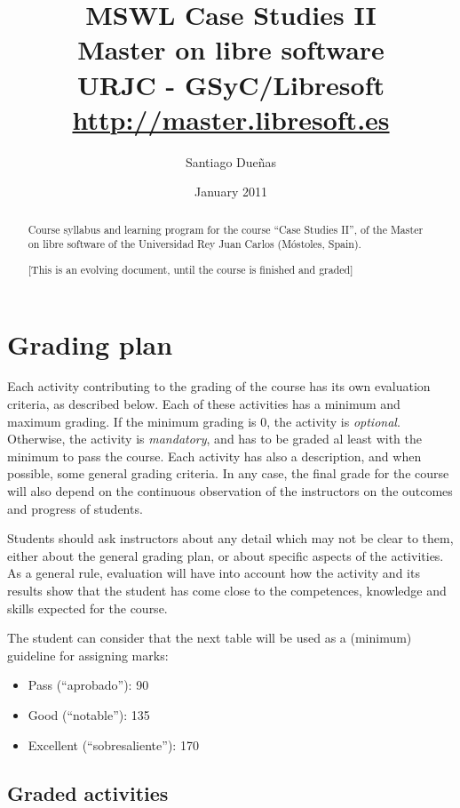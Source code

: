 \documentclass[a4paper]{article}
\title{MSWL Case Studies II \\
Master on libre software \\
URJC - GSyC/Libresoft \\
\url{http://master.libresoft.es}}
\author{Santiago Dueñas}
\date{January 2011}
\begin{document}
\maketitle

\begin{abstract}
Course syllabus and learning program for the course ``Case Studies II'', 
of the Master on libre software of the Universidad Rey Juan Carlos (Móstoles, Spain).

[This is an evolving document, until the course is finished and graded]
\end{abstract}

\tableofcontents

\section{Grading plan}

Each activity contributing to the grading of the course has its own evaluation criteria, 
as described below. Each of these activities has a minimum and maximum grading. If the 
minimum grading is 0, the activity is \textit{optional}. Otherwise, the activity is \textit{mandatory}, and 
has to be graded al least with the minimum to pass the course. Each activity has also a 
description, and when possible, some general grading criteria. In any case, the final grade 
for the course will also depend on the continuous observation of the instructors on the 
outcomes and progress of students.

Students should ask instructors about any detail which may not be clear to them, 
either about the general grading plan, or about specific aspects of the activities. 
As a general rule, evaluation will have into account how the activity and its results 
show that the student has come close to the competences, knowledge and skills expected 
for the course.

The student can consider that the next table will be used as a (minimum) guideline for 
assigning marks:

\begin{itemize}
\item Pass (``aprobado''): 90
\item Good (``notable''): 135
\item Excellent (``sobresaliente''): 170
\end{itemize}

\subsection{Graded activities}
\end{document}
